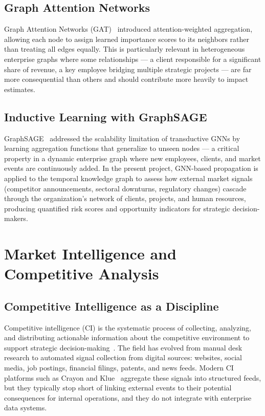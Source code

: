 \subsection{Graph Attention Networks}

Graph Attention Networks (GAT)~\cite{velickovic2018gat} introduced
attention-weighted aggregation, allowing each node to assign learned
importance scores to its neighbors rather than treating all edges equally.
This is particularly relevant in heterogeneous enterprise graphs where
some relationships — a client responsible for a significant share of revenue,
a key employee bridging multiple strategic projects — are far more
consequential than others and should contribute more heavily to impact
estimates.

\subsection{Inductive Learning with GraphSAGE}

GraphSAGE~\cite{hamilton2017graphsage} addressed the scalability limitation
of transductive GNNs by learning aggregation functions that generalize to
unseen nodes — a critical property in a dynamic enterprise graph where new
employees, clients, and market events are continuously added. In the present
project, GNN-based propagation is applied to the temporal knowledge graph
to assess how external market signals (competitor announcements, sectoral
downturns, regulatory changes) cascade through the organization's network
of clients, projects, and human resources, producing quantified risk scores
and opportunity indicators for strategic decision-makers.

\section{Market Intelligence and Competitive Analysis}

\subsection{Competitive Intelligence as a Discipline}

Competitive intelligence (CI) is the systematic process of collecting,
analyzing, and distributing actionable information about the competitive
environment to support strategic decision-making~\cite{gilad1989ci,
porter1980competitive}. The field has evolved from manual desk research to
automated signal collection from digital sources: websites, social media,
job postings, financial filings, patents, and news feeds. Modern CI platforms
such as Crayon and Klue~\cite{crayon2024} aggregate these signals into
structured feeds, but they typically stop short of linking external events
to their potential consequences for internal operations, and they do not
integrate with enterprise data systems.

